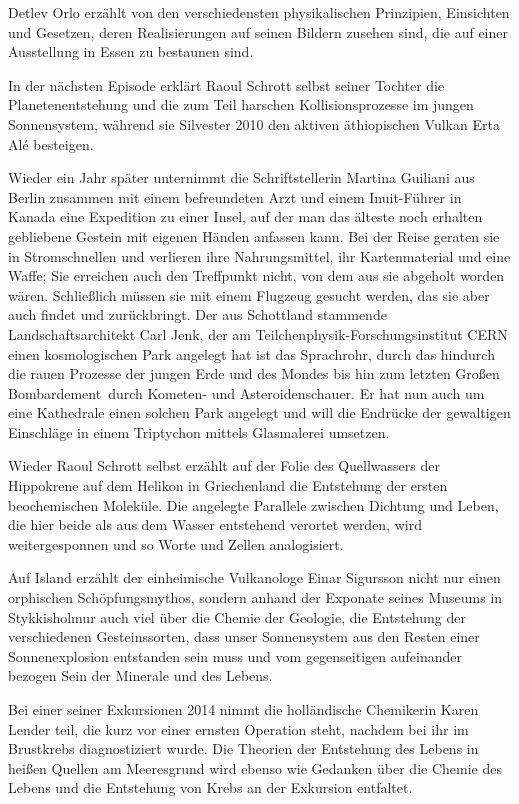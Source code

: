 Detlev Orlo erzählt von den verschiedensten physikalischen Prinzipien,
  Einsichten und Gesetzen, deren Realisierungen auf seinen Bildern zusehen sind,
  die auf einer Ausstellung in Essen zu bestaunen sind.

In der nächsten Episode erklärt Raoul Schrott selbst seiner Tochter die
  Planetenentstehung und die zum Teil harschen Kollisionsprozesse im jungen
  Sonnensystem, während sie Silvester 2010 den aktiven äthiopischen Vulkan
  Erta Alé besteigen.

Wieder ein Jahr später unternimmt die Schriftstellerin Martina Guiliani aus
  Berlin zusammen mit einem befreundeten Arzt und einem Inuit-Führer in Kanada
  eine Expedition zu einer Insel, auf der man das älteste noch erhalten
  gebliebene Gestein mit eigenen Händen anfassen kann.
Bei der Reise geraten sie in Stromschnellen und verlieren ihre Nahrungsmittel,
  ihr Kartenmaterial und eine Waffe; Sie erreichen auch den Treffpunkt nicht,
  von dem aus sie abgeholt worden wären.
Schließlich müssen sie mit einem Flugzeug gesucht werden, das sie aber auch
  findet und zurückbringt.
%
Der aus Schottland stammende Landschaftsarchitekt Carl Jenk, der am
  Teilchenphysik-Forschungsinstitut CERN einen kosmologischen Park angelegt hat
  ist das Sprachrohr, durch das hindurch die rauen Prozesse der jungen Erde
  und des Mondes bis hin zum letzten \glqq Großen Bombardement\grqq\ durch
  Kometen- und Asteroidenschauer.
Er hat nun auch um eine Kathedrale einen solchen Park angelegt und will die
  Endrücke der gewaltigen Einschläge in einem Triptychon mittels Glasmalerei 
  umsetzen.

Wieder Raoul Schrott selbst erzählt auf der Folie des Quellwassers der
  Hippokrene auf dem Helikon in Griechenland die Entstehung der ersten
  beochemischen Moleküle.
Die angelegte Parallele zwischen Dichtung und Leben, die hier beide als aus
  dem Wasser entstehend verortet werden, wird weitergesponnen und so \zB Worte
  und Zellen analogisiert.

Auf Island erzählt der einheimische Vulkanologe Einar Sigursson nicht nur
  einen orphischen Schöpfungsmythos, sondern anhand der Exponate seines
  Museums in Stykkisholmur auch viel über die Chemie der Geologie, die
  Entstehung der verschiedenen Gesteinssorten, dass unser Sonnensystem aus den
  Resten einer Sonnenexplosion entstanden sein muss und vom gegenseitigen
  aufeinander bezogen Sein der Minerale und des Lebens.

Bei einer seiner Exkursionen 2014 nimmt die holländische Chemikerin Karen Lender
  teil, die kurz vor einer ernsten Operation steht, nachdem bei ihr im
  Brustkrebs diagnostiziert wurde.
Die Theorien der Entstehung des Lebens in heißen Quellen am Meeresgrund wird
  ebenso wie Gedanken über die Chemie des Lebens und die Entstehung von Krebs
  an der Exkursion entfaltet.

